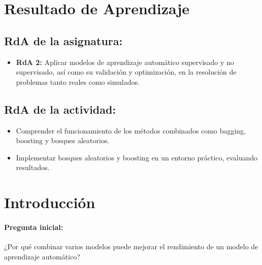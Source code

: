 \documentclass[a4,11pt]{aleph-notas}
\begin{document}
\encabezado


\section*{Resultado de Aprendizaje}

\subsection*{RdA de la asignatura:}
\begin{itemize}[leftmargin=*]
    \item \textbf{RdA 2:} 
    Aplicar modelos de aprendizaje automático supervisado y no supervisado, así como su validación y optimización, en la resolución de problemas tanto reales como simulados.
\end{itemize}

\subsection*{RdA de la actividad:}
\begin{itemize}[leftmargin=*]
    \item Comprender el funcionamiento de los métodos combinados como bagging, boosting y bosques aleatorios.  
    \item Implementar bosques aleatorios y boosting en un entorno práctico, evaluando resultados.  
\end{itemize}

\section*{Introducción}

\paragraph{Pregunta inicial:} 
¿Por qué combinar varios modelos puede mejorar el rendimiento de un modelo de aprendizaje automático?  
\end{document}

